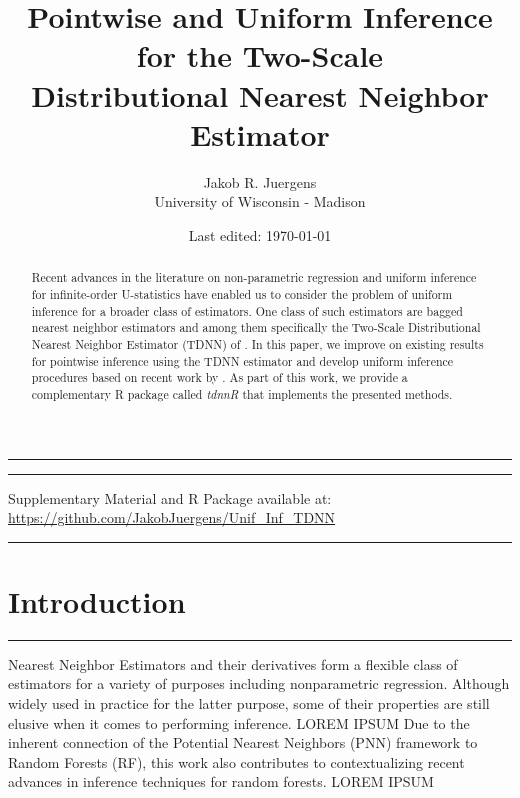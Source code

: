 \documentclass[letterpaper,10pt]{article}
\makeatletter
\numberwithin{equation}{section}
\numberwithin{thm}{section}
\numberwithin{lem}{section}
\numberwithin{cor}{section}
\newcommand{\1}{\mathbbm{1}}
\def\blfootnote{\gdef\@thefnmark{}\@footnotetext}
\makeatother
\begin{document}
\singlespacing
\title{Pointwise and Uniform Inference for the Two-Scale\\ Distributional Nearest Neighbor Estimator}
\date{Last edited: \today}
\author{Jakob R. Juergens \\ University of Wisconsin - Madison}
\maketitle
\hrule
\onehalfspacing
\begin{abstract}
	Recent advances in the literature on non-parametric regression and uniform inference for infinite-order U-statistics have enabled us to consider the problem of uniform inference for a broader class of estimators.
	One class of such estimators are bagged nearest neighbor estimators and among them specifically the Two-Scale Distributional Nearest Neighbor Estimator (TDNN) of \citet{demirkaya_optimal_2024}.
	In this paper, we improve on existing results for pointwise inference using the TDNN estimator and develop uniform inference procedures based on recent work by \citet{ritzwoller_uniform_2024}.
	As part of this work, we provide a complementary R package called \textit{tdnnR} that implements the presented methods.

\end{abstract}
\vspace{0.3cm}
\hrule
\singlespacing

\vspace{-0.3cm}
\begin{center}
	{\small Supplementary Material and R Package available at: \url{https://github.com/JakobJuergens/Unif_Inf_TDNN}}
\end{center}
\vspace{0.3cm}
\hrule
\singlespacing
\thispagestyle{empty}


\newpage
\onehalfspacing
\section{Introduction}
\hrule
Nearest Neighbor Estimators and their derivatives form a flexible class of estimators for a variety of purposes including nonparametric regression.
Although widely used in practice for the latter purpose, some of their properties are still elusive when it comes to performing inference.
	{\color{red} LOREM IPSUM}
Due to the inherent connection of the Potential Nearest Neighbors (PNN) framework to Random Forests (RF), this work also contributes to contextualizing recent advances in inference techniques for random forests.
	{\color{red} LOREM IPSUM}
\end{document}
